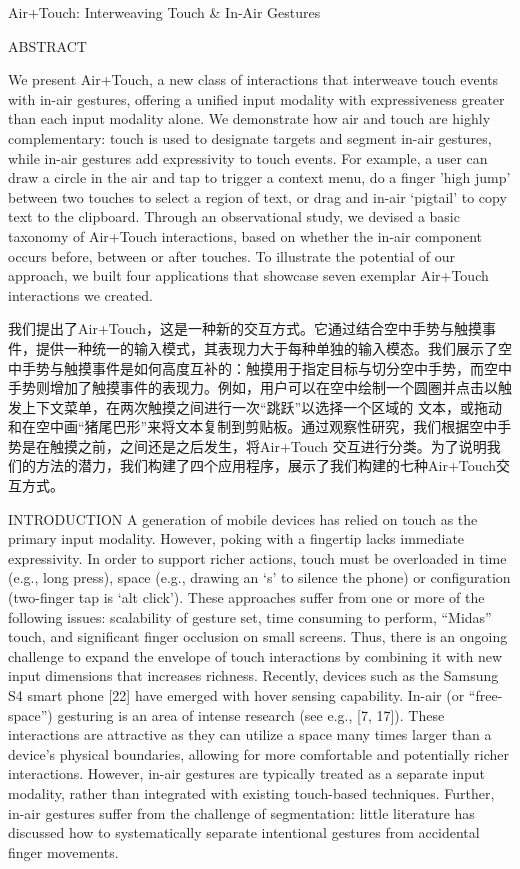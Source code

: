 Air+Touch: Interweaving Touch & In-Air Gestures

ABSTRACT

We present Air+Touch, a new class of interactions that interweave touch events with in-air gestures, offering a unified input modality with expressiveness greater than each input modality alone. We demonstrate how air and touch are highly complementary: touch is used to designate targets and segment in-air gestures, while in-air gestures add expressivity to touch events. For example, a user can draw a circle in the air and tap to trigger a context menu, do a finger 'high jump' between two touches to select a region of
text, or drag and in-air ‘pigtail’ to copy text to the clipboard. Through an observational study, we devised a basic taxonomy of Air+Touch interactions, based on whether the in-air component occurs before, between or after touches. To illustrate the potential of our approach, we built four applications that showcase seven exemplar Air+Touch interactions we created.

我们提出了Air+Touch，这是一种新的交互方式。它通过结合空中手势与触摸事件，提供一种统一的输入模式，其表现力大于每种单独的输入模态。我们展示了空中手势与触摸事件是如何高度互补的：触摸用于指定目标与切分空中手势，而空中手势则增加了触摸事件的表现力。例如，用户可以在空中绘制一个圆圈并点击以触发上下文菜单，在两次触摸之间进行一次“跳跃”以选择一个区域的
文本，或拖动和在空中画“猪尾巴形”来将文本复制到剪贴板。通过观察性研究，我们根据空中手势是在触摸之前，之间还是之后发生，将Air+Touch 交互进行分类。为了说明我们的方法的潜力，我们构建了四个应用程序，展示了我们构建的七种Air+Touch交互方式。

INTRODUCTION
A generation of mobile devices has relied on touch as the primary input modality. However, poking with a fingertip lacks immediate expressivity. In order to support richer actions, touch must be overloaded in time (e.g., long press), space (e.g., drawing an ‘s’ to silence the phone) or configuration (two-finger tap is ‘alt click’). These approaches suffer from one or more of the following issues: scalability of gesture set, time consuming to perform, “Midas” touch, and significant finger occlusion on small screens. Thus, there is an ongoing challenge to expand the envelope of touch interactions by combining it with new input dimensions that increases richness. Recently, devices such as the Samsung S4 smart phone [22] have emerged with hover sensing capability. In-air (or “free-space”) gesturing is an area of intense research (see e.g., [7, 17]). These interactions are attractive as they can utilize a space many times larger than a device’s physical boundaries, allowing for more comfortable and potentially richer interactions. However, in-air gestures are typically treated as a separate input modality, rather than integrated with existing touch-based techniques. Further, in-air gestures suffer from the challenge of segmentation: little literature has discussed how to systematically separate intentional gestures from accidental finger movements.

